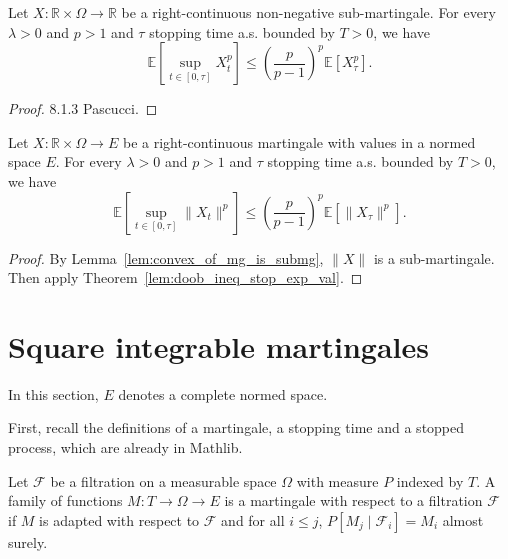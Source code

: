 \begin{lemma}\label{lem:doob_ineq_stop_exp_val}
  Let $X:\mathbb{R}\times\Omega\rightarrow \mathbb{R}$ be a right-continuous non-negative sub-martingale.
  For every $\lambda>0$ and $p>1$ and $\tau$ stopping time a.s. bounded by $T>0$, we have
  $$
  \mathbb{E}\left[ \sup_{t\in[0,\tau]}X_t^p \right]\leq \left(\frac{p}{p-1}\right)^p\mathbb{E}[X_\tau^p].
  $$
\end{lemma}
\begin{proof}
  8.1.3 Pascucci.
\end{proof}

\begin{corollary}\label{cor:doob_ineq_stop_exp_val}
  Let $X:\mathbb{R}\times\Omega\rightarrow E$ be a right-continuous martingale with values in a normed space $E$.
  For every $\lambda>0$ and $p>1$ and $\tau$ stopping time a.s. bounded by $T>0$, we have
  $$
  \mathbb{E}\left[ \sup_{t\in[0,\tau]}\lVert X_t \rVert^p \right]\leq \left(\frac{p}{p-1}\right)^p\mathbb{E}[\lVert X_\tau \rVert^p].
  $$
\end{corollary}
\begin{proof}
  By Lemma~\ref{lem:convex_of_mg_is_submg}, $\lVert X \rVert$ is a sub-martingale.
  Then apply Theorem~\ref{lem:doob_ineq_stop_exp_val}.
\end{proof}

\section{Square integrable martingales}

In this section, $E$ denotes a complete normed space.

First, recall the definitions of a martingale, a stopping time and a stopped process, which are already in Mathlib.


\begin{definition}[Martingale]\label{def:Martingale}
  \mathlibok
Let $\mathcal{F}$ be a filtration on a measurable space $\Omega$ with measure $P$ indexed by $T$.
A family of functions $M : T \to \Omega \to E$ is a martingale with respect to a filtration $\mathcal{F}$ if $M$ is adapted with respect to $\mathcal{F}$ and for all $i \le j$, $P[M_j \mid \mathcal{F}_i] = M_i$ almost surely.
\end{definition}


